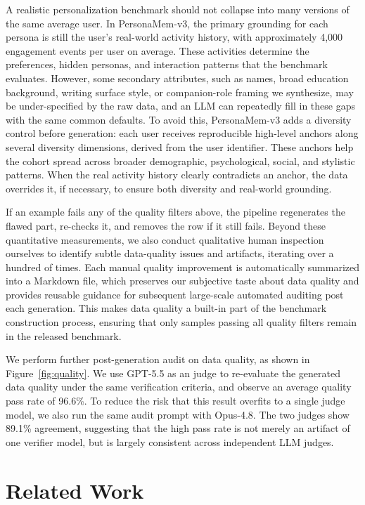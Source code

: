\documentclass[]{fairmeta}
\begin{document}
A realistic personalization benchmark should not collapse into many versions of the same average user. In PersonaMem-v3, the primary grounding for each persona is still the user’s real-world activity history, with approximately 4,000 engagement events per user on average. These activities determine the preferences, hidden personas, and interaction patterns that the benchmark evaluates. However, some secondary attributes, such as names, broad education background, writing surface style, or companion-role framing we synthesize, may be under-specified by the raw data, and an LLM can repeatedly fill in these gaps with the same common defaults. To avoid this, PersonaMem-v3 adds a diversity control before generation: each user receives reproducible high-level anchors along several diversity dimensions, derived from the user identifier. These anchors help the cohort spread across broader demographic, psychological, social, and stylistic patterns. When the real activity history clearly contradicts an anchor, the data overrides it, if necessary, to ensure both diversity and real-world grounding.

If an example fails any of the quality filters above, the pipeline regenerates the flawed part, re-checks it, and removes the row if it still fails. Beyond these quantitative measurements, we also conduct qualitative human inspection ourselves to identify subtle data-quality issues and artifacts, iterating over a hundred of times. Each manual quality improvement is automatically summarized into a Markdown file, which preserves our subjective taste about data quality and provides reusable guidance for subsequent large-scale automated auditing post each generation. This makes data quality a built-in part of the benchmark construction process, ensuring that only samples passing all quality filters remain in the released benchmark. 

We perform further post-generation audit on data quality, as shown in Figure~\ref{fig:quality}. We use GPT-5.5 as an judge to re-evaluate the generated data quality under the same verification criteria, and observe an average quality pass rate of 96.6\%. To reduce the risk that this result overfits to a single judge model, we also run the same audit prompt with Opus-4.8. The two judges show 89.1\% agreement, suggesting that the high pass rate is not merely an artifact of one verifier model, but is largely consistent across independent LLM judges.

\section{Related Work}
\label{section:related_work}
\end{document}
